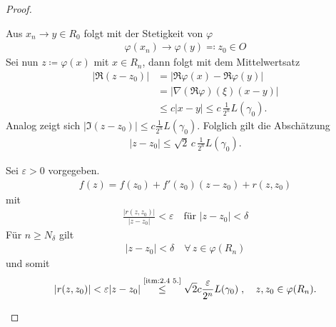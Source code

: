 \begin{theorem}
\begin{proof}
\begin{enum-arab}
      \item \label{itm:2.4 5.} Aus $x_n \to y \in R_0$ folgt mit der Stetigkeit von $\varphi$
      \begin{align*}
        \varphi(x_n) \to \varphi(y) \eqcolon z_0 \in O
      \end{align*}
      Sei nun $z \coloneq \varphi(x)$ mit $x \in R_n$, dann folgt mit dem Mittelwertsatz
      \begin{align*}
        |\Re(z-z_0)| &= |\Re \varphi(x) - \Re \varphi(y)| \\
        &= | \nabla (\Re \varphi)(\xi)(x-y)| \\
        &\leq c |x-y| \leq c \, \frac{1}{2^n} L(\gamma_0).
      \end{align*}
      Analog zeigt sich $|\Im (z - z_0)| \le c \frac 1{2^n} L(\gamma_0)$.
      Folglich gilt die Abschätzung
      \begin{align*}
        |z-z_0| \leq \sqrt{2} \, c \, \frac{1}{2^n} L(\gamma_0).
      \end{align*}
      
      
      \item \label{itm:2.4 6.} Sei $\varepsilon > 0$ vorgegeben.
      \begin{align*}
        f(z) = f(z_0) + f'(z_0) (z-z_0) + r(z,z_0)
      \end{align*}
      mit 
      \begin{align*}
        \frac{|r(z,z_0)|}{|z-z_0|} < \varepsilon \quad \text{für } |z-z_0| < \delta
      \end{align*}
      Für $n \geq N_\delta$ gilt
      \begin{align*}
        |z-z_0| < \delta \quad \forall \, z \in \varphi(R_n)
      \end{align*}
      und somit
      \begin{align*}
        |r(z,z_0)| < \varepsilon |z-z_0| \overset{\text{\ref{itm:2.4 5.}}}{\leq} \sqrt{2} c \frac{\varepsilon}{2^n} L(\gamma_0) \; , \quad z,z_0 \in \varphi(R_n).
      \end{align*}
      

\end{enum-arab}
\end{proof}
\end{theorem}
